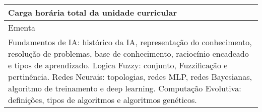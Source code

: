 \begin{quadro}[ht!]
\begin{tabular}{|p{3cm} p{2cm} p{3cm} p{2cm} p{3cm} p{2cm}|}
\multicolumn{5}{|p{13cm}|}{\cellcolor{blue1} Carga horária total da unidade curricular} & \multicolumn{1}{p{1cm}|}{\raggedleft 60	}\\\hline
\multicolumn{6}{|p{15cm}|}{\cellcolor{blue1} Ementa} \\\hline
\hline\multicolumn{6}{|p{15cm}|}{\scriptsize Fundamentos de IA: histórico da IA, representação do conhecimento, resolução de problemas, base de conhecimento, raciocínio encadeado e tipos de aprendizado. Logica Fuzzy: conjunto, Fuzzificação e pertinência. Redes Neurais: topologias, redes MLP, redes Bayesianas, algoritmo de treinamento e deep learning. Computação Evolutiva: definições, tipos de algoritmos e algoritmos genéticos.}\\\hline
\hline
	\end{tabular}
\end{quadro}
